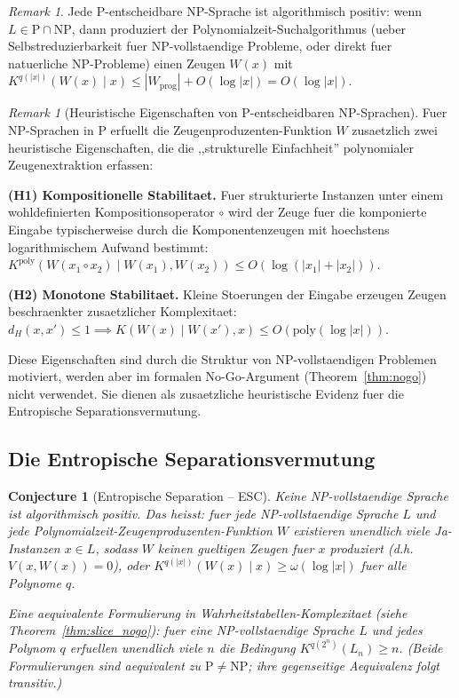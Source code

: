 \documentclass[aps,prd,twocolumn,superscriptaddress,nofootinbib]{revtex4-2}
\newtheorem{conjecture}[theorem]{Conjecture}
\theoremstyle{definition}
\theoremstyle{remark}
\newtheorem{remark}[theorem]{Remark}
\DeclareMathOperator{\poly}{poly}
\newcommand{\NP}{\mathrm{NP}}
\newcommand{\PP}{\mathrm{P}}
\begin{document}
\begin{remark}
Jede $\PP$-entscheidbare NP-Sprache ist algorithmisch positiv: wenn $L \in \PP \cap \NP$, dann produziert der Polynomialzeit-Suchalgorithmus (ueber Selbstreduzierbarkeit fuer NP-vollstaendige Probleme, oder direkt fuer natuerliche NP-Probleme) einen Zeugen $W(x)$ mit $K^{q(|x|)}(W(x) \mid x) \leq |W_{\text{prog}}| + O(\log|x|) = O(\log|x|)$.
\end{remark}

\begin{remark}[Heuristische Eigenschaften von P-entscheidbaren NP-Sprachen]
\label{rem:heuristic-ap}
Fuer NP-Sprachen in $\PP$ erfuellt die Zeugenproduzenten-Funktion $W$ zusaetzlich zwei heuristische Eigenschaften, die die ,,strukturelle Einfachheit'' polynomialer Zeugenextraktion erfassen:

\textbf{(H1) Kompositionelle Stabilitaet.} Fuer strukturierte Instanzen unter einem wohldefinierten Kompositionsoperator $\circ$ wird der Zeuge fuer die komponierte Eingabe typischerweise durch die Komponentenzeugen mit hoechstens logarithmischem Aufwand bestimmt: $K^{\poly}(W(x_1 \circ x_2) \mid W(x_1), W(x_2)) \leq O(\log(|x_1|+|x_2|))$.

\textbf{(H2) Monotone Stabilitaet.} Kleine Stoerungen der Eingabe erzeugen Zeugen beschraenkter zusaetzlicher Komplexitaet: $d_H(x,x') \leq 1 \implies K(W(x) \mid W(x'), x) \leq O(\mathrm{poly}(\log|x|))$.

Diese Eigenschaften sind durch die Struktur von $\NP$-vollstaendigen Problemen motiviert, werden aber im formalen No-Go-Argument (Theorem~\ref{thm:nogo}) nicht verwendet. Sie dienen als zusaetzliche heuristische Evidenz fuer die Entropische Separationsvermutung.
\end{remark}

\subsection{Die Entropische Separationsvermutung}

\begin{conjecture}[Entropische Separation -- ESC]
\label{conj:entropic}
Keine NP-vollstaendige Sprache ist algorithmisch positiv. Das heisst: fuer jede NP-vollstaendige Sprache $L$ und jede Polynomialzeit-Zeugenproduzenten-Funktion $W$ existieren unendlich viele Ja-Instanzen $x \in L$, sodass $W$ keinen gueltigen Zeugen fuer $x$ produziert (d.h. $V(x, W(x)) = 0$), oder $K^{q(|x|)}(W(x) \mid x) \geq \omega(\log|x|)$ fuer alle Polynome $q$.

Eine aequivalente Formulierung in Wahrheitstabellen-Komplexitaet (siehe Theorem~\ref{thm:slice_nogo}): fuer eine NP-vollstaendige Sprache $L$ und jedes Polynom $q$ erfuellen unendlich viele $n$ die Bedingung $K^{q(2^n)}(L_n) \geq n$. (Beide Formulierungen sind aequivalent zu $\PP \neq \NP$; ihre gegenseitige Aequivalenz folgt transitiv.)
\end{conjecture}
\end{document}
